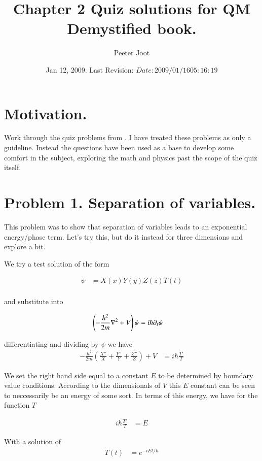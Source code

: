 \documentclass{article}
\title{ Chapter 2 Quiz solutions for QM Demystified book. }
\author{Peeter Joot}
\date{ Jan 12, 2009.  Last Revision: $Date: 2009/01/16 05:16:19 $ }
\begin{document}
\maketitle{}
\tableofcontents
\section{ Motivation. }

Work through the quiz problems from \cite{mcmahon2005qmd}.  I have treated these problems as only a guideline.  Instead the questions have been used as a
base to develop some comfort in the subject, exploring the math and physics past the scope of the quiz itself.

\section{ Problem 1. Separation of variables. }

This problem was to show that separation of variables leads to an exponential energy/phase
term.  Let's try this, but do it instead for three dimensions and explore a bit.

We try a test solution of the form

\begin{align*}
\psi &= X(x) Y(y) Z(z) T(t) \\
\end{align*}

and substitute into 

\begin{align*}
\left(-\frac{\hbar^2}{2m}\nabla^2 + V\right) \psi &= i \hbar \partial_t \psi
\end{align*}

differentiating and dividing by $\psi$ we have
\begin{align*}
-\frac{\hbar^2}{2m}
\left(
\frac{X''}{X}
+\frac{Y''}{Y}
+\frac{Z''}{Z}
\right)
 + V &= i \hbar \frac{T'}{T}
\end{align*}

We set the right hand side equal to a constant $E$ to be determined by boundary value conditions.
According to the dimensionals of $V$ this $E$ constant can be seen to neccessarily be an energy
of some sort.  In terms of this energy, we have for the function $T$

\begin{align*}
i \hbar \frac{T'}{T} &= E
\end{align*}

With a solution of
\begin{align*}
T(t) &= e^{-i E t/\hbar}
\end{align*}
\end{document}
